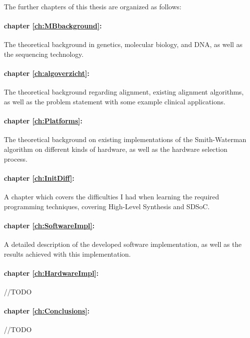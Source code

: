 The further chapters of this thesis are organized as follows:

\paragraph{chapter \ref{ch:MBbackground}:} The theoretical background in genetics, molecular biology, and DNA, as well as the sequencing technology.
\paragraph{chapter \ref{ch:algoverzicht}:} The theoretical background regarding alignment, existing alignment algorithms, as well as the problem statement with some example clinical applications.
\paragraph{chapter \ref{ch:Platforms}:} The theoretical background on existing implementations of the Smith-Waterman algorithm on different kinds of hardware, as well as the hardware selection process.
\paragraph{chapter \ref{ch:InitDiff}:} A chapter which covers the difficulties I had when learning the required programming techniques, covering High-Level Synthesis and SDSoC. 
\paragraph{chapter \ref{ch:SoftwareImpl}:} A detailed description of the developed software implementation, as well as the results achieved with this implementation.
\paragraph{chapter \ref{ch:HardwareImpl}:} //TODO
\paragraph{chapter \ref{ch:Conclusions}:} //TODO